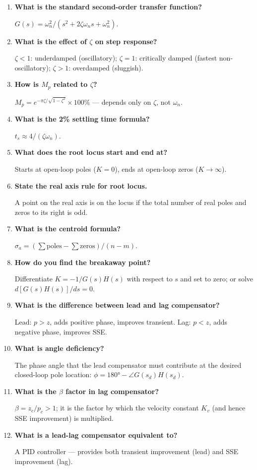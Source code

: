 \documentclass[12pt,a4paper]{article}
\newcommand{\Q}[1]{\textbf{#1}\par\noindent\ignorespaces}
\begin{document}
\begin{tcolorbox}[exambox, title={\textbf{Frequently Asked / Viva Questions}}]
\begin{enumerate}[leftmargin=*, topsep=0pt, label=\textbf{Q\arabic*.}, itemsep=8pt]
  \item \Q{What is the standard second-order transfer function?} $G(s) = \omega_n^2/(s^2+2\zeta\omega_n s+\omega_n^2)$.
  \item \Q{What is the effect of $\zeta$ on step response?} $\zeta<1$: underdamped (oscillatory); $\zeta=1$: critically damped (fastest non-oscillatory); $\zeta>1$: overdamped (sluggish).
  \item \Q{How is $M_p$ related to $\zeta$?} $M_p = e^{-\pi\zeta/\sqrt{1-\zeta^2}}\times100\%$ — depends only on $\zeta$, not $\omega_n$.
  \item \Q{What is the 2\% settling time formula?} $t_s \approx 4/(\zeta\omega_n)$.
  \item \Q{What does the root locus start and end at?} Starts at open-loop poles ($K=0$), ends at open-loop zeros ($K\to\infty$).
  \item \Q{State the real axis rule for root locus.} A point on the real axis is on the locus if the total number of real poles and zeros to its right is odd.
  \item \Q{What is the centroid formula?} $\sigma_a = (\sum\text{poles} - \sum\text{zeros})/(n-m)$.
  \item \Q{How do you find the breakaway point?} Differentiate $K = -1/G(s)H(s)$ with respect to $s$ and set to zero; or solve $d[G(s)H(s)]/ds = 0$.
  \item \Q{What is the difference between lead and lag compensator?} Lead: $p>z$, adds positive phase, improves transient. Lag: $p<z$, adds negative phase, improves SSE.
  \item \Q{What is angle deficiency?} The phase angle that the lead compensator must contribute at the desired closed-loop pole location: $\phi = 180° - \angle G(s_d)H(s_d)$.
  \item \Q{What is the $\beta$ factor in lag compensator?} $\beta = z_c/p_c > 1$; it is the factor by which the velocity constant $K_v$ (and hence SSE improvement) is multiplied.
  \item \Q{What is a lead-lag compensator equivalent to?} A PID controller — provides both transient improvement (lead) and SSE improvement (lag).
\end{enumerate}
\end{tcolorbox}
\end{document}
